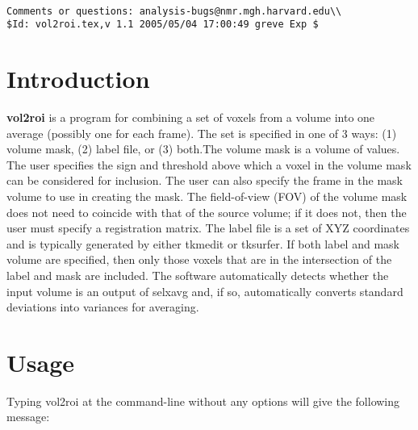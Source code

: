 \documentclass[10pt]{article}
\begin{document}
\begin{Large}
 \\
\end{Large}

\noindent 
\begin{verbatim}
Comments or questions: analysis-bugs@nmr.mgh.harvard.edu\\
$Id: vol2roi.tex,v 1.1 2005/05/04 17:00:49 greve Exp $
\end{verbatim}

\section{Introduction}

{\bf vol2roi} is a program for combining a set of voxels from a volume
into one average (possibly one for each frame). The set is specified
in one of 3 ways: (1) volume mask, (2) label file, or (3) both.The
volume mask is a volume of values. The user specifies the sign and
threshold above which a voxel in the volume mask can be considered for
inclusion. The user can also specify the frame in the mask volume to
use in creating the mask.  The field-of-view (FOV) of the volume mask
does not need to coincide with that of the source volume; if it does
not, then the user must specify a registration matrix.  The label file
is a set of XYZ coordinates and is typically generated by either
tkmedit or tksurfer.  If both label and mask volume are specified, then
only those voxels that are in the intersection of the label and mask
are included.  The software automatically detects whether the input
volume is an output of selxavg and, if so, automatically converts
standard deviations into variances for averaging.\\

\section{Usage}
Typing vol2roi at the command-line without any options will give the
following message:\\ 
\end{document}
